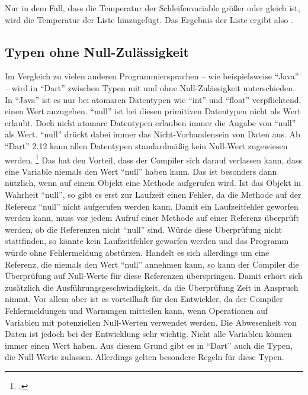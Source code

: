 Nur in dem Fall, dass die Temperatur der Schleifenvariable  größer oder gleich  ist, wird die Temperatur der Liste hinzugefügt.
Das Ergebnis der Liste  ergibt also \IC{[38.5, 41]}.


\subsection{Typen ohne Null-Zulässigkeit} Im Vergleich zu vielen anderen Programmiersprachen -- wie beispielsweise \enquote{Java} -- wird in \enquote{Dart} zwischen Typen mit und ohne Null-Zulässigkeit unterschieden.
In \enquote{Java} ist es nur bei atomaren Datentypen wie \enquote{int} und \enquote{float} verpflichtend, einen Wert anzugeben.
\enquote{null} ist bei diesen primitiven Datentypen nicht als Wert erlaubt.
Doch nicht atomare Datentypen erlauben immer die Angabe von \enquote{null} als Wert.
\enquote{null} drückt dabei immer das Nicht-Vorhandensein von Daten aus.
Ab \enquote{Dart} 2.12   kann allen Datentypen standardmäßig kein Null-Wert zugewiesen werden. \footcite[Vgl.][]{AnnouncingDartTwoDotTwelve}
Das hat den Vorteil, dass der Compiler sich darauf verlassen kann, 
dass eine Variable niemals den Wert \enquote{null} haben kann. 
Das ist besonders dann nützlich, 
wenn auf einem Objekt eine Methode aufgerufen wird. 
Ist das Objekt in Wahrheit \enquote{null}, 
so gibt es erst zur Laufzeit einen Fehler, 
da die Methode auf der Referenz \enquote{null} nicht aufgerufen werden kann. 
Damit ein Laufzeitfehler geworfen werden kann, 
muss vor jedem Aufruf einer Methode auf einer Referenz überprüft werden, ob die Referenzen nicht \enquote{null} sind. 
Würde diese Überprüfung nicht stattfinden, 
so könnte kein Laufzeitfehler geworfen werden und das Programm würde ohne Fehlermeldung abstürzen. 
Handelt es sich allerdings um eine Referenz, 
die niemals den Wert \enquote{null} annehmen kann, 
so kann der Compiler die Überprüfung auf Null-Werte für diese Referenzen überspringen. 
Damit erhört sich zusätzlich die Ausführungsgeschwindigkeit, 
da die Überprüfung Zeit in Anspruch nimmt. 
Vor allem aber ist es vorteilhaft für den Entwickler, 
da der Compiler  Fehlermeldungen und Warnungen mitteilen kann, 
wenn Operationen auf Variablen mit potenziellen Null-Werten verwendet werden. 
Die Abwesenheit von Daten ist jedoch bei der Entwicklung sehr wichtig. 
Nicht alle Variablen können immer einen Wert haben. 
Aus diesem Grund gibt es in \enquote{Dart} auch die Typen, 
die Null-Werte zulassen.
Allerdings gelten besondere Regeln für diese Typen.

